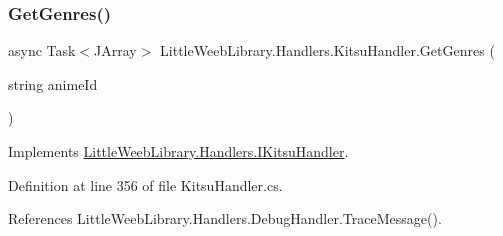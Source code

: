 \subsubsection{\texorpdfstring{Get\+Genres()}{GetGenres()}}
{\footnotesize\ttfamily async Task$<$J\+Array$>$ Little\+Weeb\+Library.\+Handlers.\+Kitsu\+Handler.\+Get\+Genres (\begin{DoxyParamCaption}\item[{string}]{anime\+Id }\end{DoxyParamCaption})}



Implements \mbox{\hyperlink{interface_little_weeb_library_1_1_handlers_1_1_i_kitsu_handler_a22e208a4c0ea64dafdbeb1a133739bfd}{Little\+Weeb\+Library.\+Handlers.\+I\+Kitsu\+Handler}}.



Definition at line 356 of file Kitsu\+Handler.\+cs.



References Little\+Weeb\+Library.\+Handlers.\+Debug\+Handler.\+Trace\+Message().



